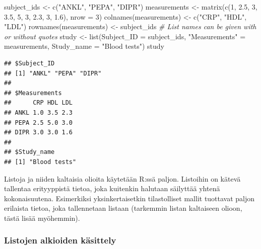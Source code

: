 \documentclass[
]{book}
\newenvironment{Shaded}{\begin{snugshade}}{\end{snugshade}}
\newcommand{\AttributeTok}[1]{\textcolor[rgb]{0.77,0.63,0.00}{#1}}
\newcommand{\CommentTok}[1]{\textcolor[rgb]{0.56,0.35,0.01}{\textit{#1}}}
\newcommand{\DecValTok}[1]{\textcolor[rgb]{0.00,0.00,0.81}{#1}}
\newcommand{\FloatTok}[1]{\textcolor[rgb]{0.00,0.00,0.81}{#1}}
\newcommand{\FunctionTok}[1]{\textcolor[rgb]{0.00,0.00,0.00}{#1}}
\newcommand{\NormalTok}[1]{#1}
\newcommand{\OtherTok}[1]{\textcolor[rgb]{0.56,0.35,0.01}{#1}}
\newcommand{\StringTok}[1]{\textcolor[rgb]{0.31,0.60,0.02}{#1}}
\begin{document}
\begin{Shaded}
\begin{Highlighting}[]
\NormalTok{subject\_ids }\OtherTok{\textless{}{-}} \FunctionTok{c}\NormalTok{(}\StringTok{"ANKL"}\NormalTok{, }\StringTok{"PEPA"}\NormalTok{, }\StringTok{"DIPR"}\NormalTok{)}
\NormalTok{measurements }\OtherTok{\textless{}{-}} \FunctionTok{matrix}\NormalTok{(}\FunctionTok{c}\NormalTok{(}\DecValTok{1}\NormalTok{, }\FloatTok{2.5}\NormalTok{, }\DecValTok{3}\NormalTok{,}
                         \FloatTok{3.5}\NormalTok{, }\DecValTok{5}\NormalTok{, }\DecValTok{3}\NormalTok{,}
                         \FloatTok{2.3}\NormalTok{, }\DecValTok{3}\NormalTok{, }\FloatTok{1.6}\NormalTok{),}
                       \AttributeTok{nrow =} \DecValTok{3}\NormalTok{)}
\FunctionTok{colnames}\NormalTok{(measurements) }\OtherTok{\textless{}{-}} \FunctionTok{c}\NormalTok{(}\StringTok{"CRP"}\NormalTok{, }\StringTok{"HDL"}\NormalTok{, }\StringTok{"LDL"}\NormalTok{)}
\FunctionTok{rownames}\NormalTok{(measurements) }\OtherTok{\textless{}{-}}\NormalTok{ subject\_ids}
\CommentTok{\# List names can be given with or without quotes}
\NormalTok{study }\OtherTok{\textless{}{-}} \FunctionTok{list}\NormalTok{(}\AttributeTok{Subject\_ID =}\NormalTok{ subject\_ids,}
              \StringTok{"Measurements"} \OtherTok{=}\NormalTok{ measurements,}
              \AttributeTok{Study\_name =} \StringTok{"Blood tests"}\NormalTok{)}
\NormalTok{study}
\end{Highlighting}
\end{Shaded}

\begin{verbatim}
## $Subject_ID
## [1] "ANKL" "PEPA" "DIPR"
## 
## $Measurements
##      CRP HDL LDL
## ANKL 1.0 3.5 2.3
## PEPA 2.5 5.0 3.0
## DIPR 3.0 3.0 1.6
## 
## $Study_name
## [1] "Blood tests"
\end{verbatim}

Listoja ja niiden kaltaisia olioita käytetään R:ssä paljon. Listoihin on kätevä tallentaa erityyppistä tietoa, joka kuitenkin halutaan säilyttää yhtenä kokonaisuutena. Esimerkiksi yksinkertaisetkin tilastolliset mallit tuottavat paljon erilaista tietoa, joka tallennetaan listaan (tarkemmin listan kaltaiseen olioon, tästä lisää myöhemmin).

\hypertarget{listojen-alkioiden-kuxe4sittely}{%
\subsubsection{Listojen alkioiden käsittely}\label{listojen-alkioiden-kuxe4sittely}}
\end{document}
